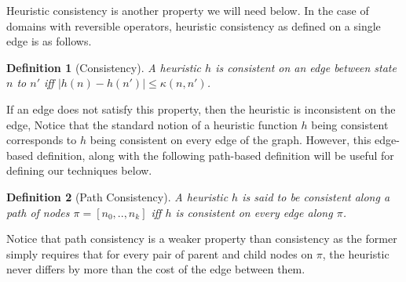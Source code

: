 \documentclass{article}
\newtheorem{definition}{Definition}
\begin{document}


Heuristic consistency is another property we will need below. In the case of domains with reversible operators, heuristic consistency as defined on a single edge is as follows.

\begin{definition}[Consistency]
A heuristic $h$ is consistent on an edge between state $n$ to $n'$ iff $|h(n) - h(n')| \le \kappa(n,n')$.
\label{def:consistency}
\end{definition}
If an edge does not satisfy this property, then the heuristic is inconsistent on the edge,
Notice that the standard notion of a heuristic function $h$ being consistent corresponds to $h$ being consistent on every edge of the graph. However, this edge-based definition, along with the following path-based definition will be useful for defining our techniques below.


\begin{definition}[Path Consistency]
A heuristic $h$ is said to be consistent along a path of nodes $\pi=[n_0,..,n_k]$ iff $h$ is consistent on every edge along $\pi$. 
\end{definition}

Notice that path consistency is a weaker property than consistency as the former simply requires that for every pair of parent and child nodes on $\pi$, the heuristic never differs by more than the cost of the edge between them.

%
%
%
\end{document}

